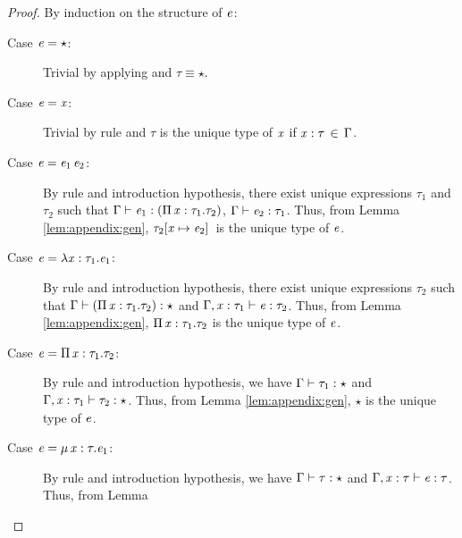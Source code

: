 \begin{proof}
	By induction on the structure of $\mathit{e}$:
	\begin{description}
	    \item[Case $\mathit{e}  =  \star$:] Trivial by applying  and $\tau  \equiv  \star$.
		\item[Case $\mathit{e}  =  \mathit{x}$:] Trivial by rule  and $\tau$ is the
unique type of $\mathit{x}$ if $\mathit{x}  :  \tau \, \in \, \Gamma$.
		\item[Case $\mathit{e}=\mathit{e_{{\mathrm{1}}}} \, \mathit{e_{{\mathrm{2}}}}$:] By rule  and introduction
hypothesis, there exist unique expressions $\tau_{{\mathrm{1}}}$ and $\tau_{{\mathrm{2}}}$ such that $\Gamma  \vdash  \mathit{e_{{\mathrm{1}}}}  :  (  \Pi \, \mathit{x}  :  \tau_{{\mathrm{1}}}  .  \tau_{{\mathrm{2}}}  )$, $\Gamma  \vdash  \mathit{e_{{\mathrm{2}}}}  :  \tau_{{\mathrm{1}}}$. Thus, from Lemma
\ref{lem:appendix:gen}, $\tau_{{\mathrm{2}}}  [  \mathit{x}  \mapsto  \mathit{e_{{\mathrm{2}}}}  ] \,$ is the unique type of $\mathit{e}$.
		\item[Case $\mathit{e}  =  \lambda  \mathit{x}  :  \tau_{{\mathrm{1}}}  .  \mathit{e_{{\mathrm{1}}}}$:] By rule  and introduction
hypothesis, there exist unique expressions $\tau_{{\mathrm{2}}}$ such that $\Gamma  \vdash  (  \Pi \, \mathit{x}  :  \tau_{{\mathrm{1}}}  .  \tau_{{\mathrm{2}}}  )  :  \star$ and $\Gamma  ,  \mathit{x}  :  \tau_{{\mathrm{1}}}  \vdash  \mathit{e}  :  \tau_{{\mathrm{2}}}$. Thus, from Lemma
\ref{lem:appendix:gen}, $\Pi \, \mathit{x}  :  \tau_{{\mathrm{1}}}  .  \tau_{{\mathrm{2}}}$ is the unique type of $\mathit{e}$.
		\item[Case $\mathit{e}  =  \Pi \, \mathit{x}  :  \tau_{{\mathrm{1}}}  .  \tau_{{\mathrm{2}}}$:] By rule  and introduction
hypothesis, we have $\Gamma  \vdash  \tau_{{\mathrm{1}}}  :  \star$ and $\Gamma  ,  \mathit{x}  :  \tau_{{\mathrm{1}}}  \vdash  \tau_{{\mathrm{2}}}  :  \star$. Thus, from Lemma
\ref{lem:appendix:gen}, $\star$ is the unique type of $\mathit{e}$.
		\item[Case $\mathit{e}  =  \mu \, \mathit{x}  :  \tau  .  \mathit{e_{{\mathrm{1}}}}$:] By rule  and introduction
hypothesis, we have $\Gamma  \vdash  \tau  :  \star$ and $\Gamma  ,  \mathit{x}  :  \tau  \vdash  \mathit{e}  :  \tau$. Thus, from Lemma

\end{description}
\end{proof}
